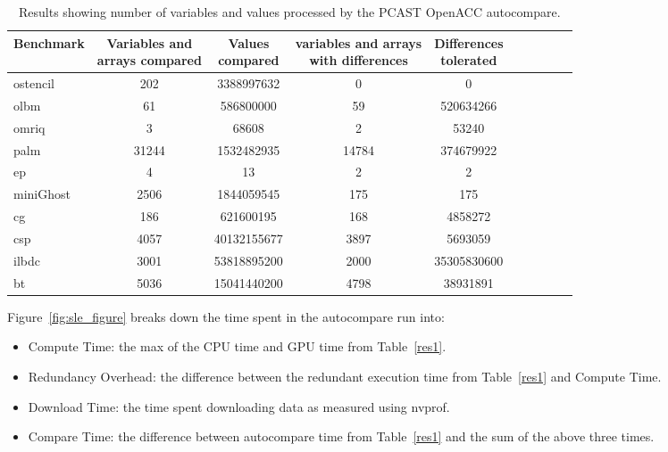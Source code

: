 \begin{table}
\begin{center}
\begin{tabular}{|l|c|c|c|c|c|c|c|c|c|}
\hline

Benchmark &  \parbox[c]{3 cm}{\centering Variables and \\ arrays compared} &  \parbox[c]{2 cm}{\centering Values \\ compared} &  \parbox[c]{3 cm}{\centering variables and arrays \\     with differences} & \parbox[c]{2 cm}{\centering Differences \\      tolerated}\\



\hline

ostencil  & 202 & 3388997632 & 0 & 0\\
olbm      & 61 & 586800000 & 59 & 520634266\\
omriq     & 3 & 68608 & 2 & 53240 \\
palm      & 31244 & 1532482935 & 14784 & 374679922\\
ep        & 4 & 13 & 2 & 2 \\
miniGhost & 2506 & 1844059545 & 175 & 175\\
cg        & 186 & 621600195 & 168 & 4858272\\
csp       & 4057 & 40132155677	& 3897 & 5693059\\
ilbdc     & 3001 & 53818895200 & 2000 & 35305830600 \\
bt        & 5036 & 15041440200 & 4798 & 38931891 \\

            
\hline
\end{tabular}
\end{center}
\caption{Results showing number of variables and values processed by the PCAST OpenACC autocompare.}
\label{res2}
\end{table}




Figure~\ref{fig:sle_figure} breaks down the time spent in the autocompare run into:
\begin{itemize}
\item Compute Time: the max of the CPU time and GPU time from Table~\ref{res1}.
\item Redundancy Overhead: the difference between the redundant execution time from Table~\ref{res1} and Compute Time.
\item Download Time: the time spent downloading data as measured using nvprof.
\item Compare Time: the difference between autocompare time from Table~\ref{res1} and the sum of the above three times.
\end{itemize}

